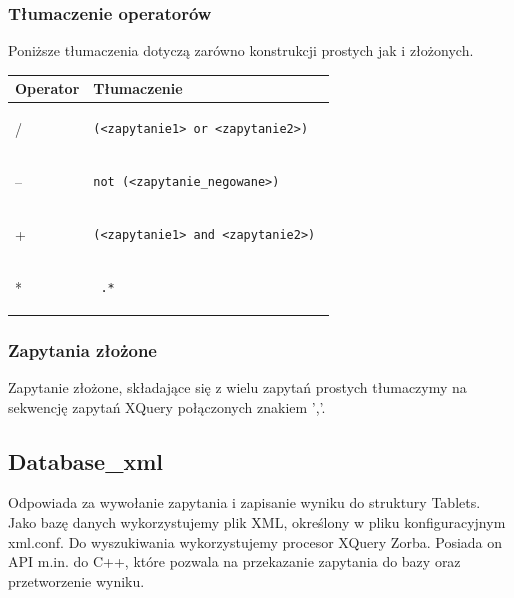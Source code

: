 \subsubsection{Tłumaczenie operatorów}
Poniższe tłumaczenia dotyczą zarówno konstrukcji prostych jak i złożonych.

\begin{longtable}{|p{1in}|p{3in}|}
\hline
{\bf Operator} & {\bf Tłumaczenie}\\
\hline
\endhead
/ & \begin{verbatim}(<zapytanie1> or <zapytanie2>) \end{verbatim} \\
\hline
-- & \begin{verbatim}not (<zapytanie_negowane>) \end{verbatim}\\  
\hline
+ & \begin{verbatim}(<zapytanie1> and <zapytanie2>) \end{verbatim}\\ 
\hline
* & \begin{verbatim} .*\end{verbatim}  \\ 
\hline
\end{longtable}

\subsubsection{Zapytania złożone}
Zapytanie złożone, składające się z wielu zapytań prostych tłumaczymy na sekwencję zapytań XQuery połączonych znakiem ','.

\subsection{Database\_xml}
Odpowiada za wywołanie zapytania i zapisanie wyniku do struktury Tablets.
Jako bazę danych wykorzystujemy plik XML, określony w pliku konfiguracyjnym xml.conf. 
Do wyszukiwania wykorzystujemy procesor XQuery Zorba. 
Posiada on API m.in. do C++, które pozwala na przekazanie zapytania do bazy oraz przetworzenie wyniku.
